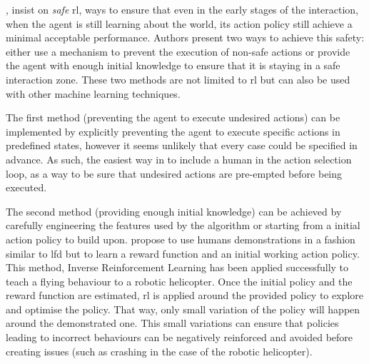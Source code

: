 	\cite{garcia2015comprehensive}, insist on \textit{safe} \gls{rl}, ways to ensure that even in the early stages of the interaction, when the agent is still learning about the world, its action policy still achieve a minimal acceptable performance. Authors present two ways to achieve this safety: either use a mechanism to prevent the execution of non-safe actions or provide the agent with enough initial knowledge to ensure that it is staying in a safe interaction zone. These two methods are not limited to \gls{rl} but can also be used with other machine learning techniques. 
	
	The first method (preventing the agent to execute undesired actions) can be implemented by explicitly preventing the agent to execute specific actions in predefined states, however it seems unlikely that every case could be specified in advance. As such, the easiest way in to include a human in the action selection loop, as a way to be sure that undesired actions are pre-empted before being executed. %
	
	The second method (providing enough initial knowledge) can be achieved by carefully engineering the features used by the algorithm or starting from a initial action policy to build upon. \cite{abbeel2004apprenticeship} propose to use humans demonstrations in a fashion similar to \gls{lfd} but to learn a reward function and an initial working action policy. This method, Inverse Reinforcement Learning has been applied successfully to teach a flying behaviour to a robotic helicopter. Once the initial policy and the reward function are estimated, \gls{rl} is applied around the provided policy to explore and optimise the policy. That way, only small variation of the policy will happen around the demonstrated one. This small variations can ensure that policies leading to incorrect behaviours can be negatively reinforced and avoided before creating issues (such as crashing in the case of the robotic helicopter). 
	
	
